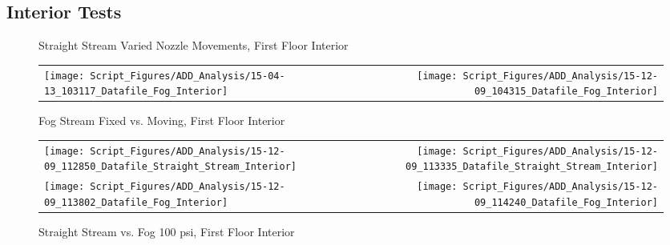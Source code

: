 \documentclass{article}
\begin{document}
\clearpage

\subsection{Interior Tests}

\begin{figure}[ht]
\centering
{}
\caption{Straight Stream Varied Nozzle Movements, First Floor Interior}
\label{fig:Straight Stream Varied Nozzle Movements, First Floor Interior}
\end{figure}

\begin{figure}[ht]
\begin{tabular*}{\textwidth}{lr}
\texttt{[image: Script\_Figures/ADD\_Analysis/15-04-13\_103117\_Datafile\_Fog\_Interior]} &
\texttt{[image: Script\_Figures/ADD\_Analysis/15-12-09\_104315\_Datafile\_Fog\_Interior]} \\
\end{tabular*}
\caption{Fog Stream Fixed vs. Moving, First Floor Interior}
\label{fig:Fog Stream Fixed vs. Moving, First Floor Interior}
\end{figure}

\clearpage

\begin{figure}[ht]
\begin{tabular*}{\textwidth}{lr}
\texttt{[image: Script\_Figures/ADD\_Analysis/15-12-09\_112850\_Datafile\_Straight\_Stream\_Interior]} &
\texttt{[image: Script\_Figures/ADD\_Analysis/15-12-09\_113335\_Datafile\_Straight\_Stream\_Interior]} \\
\texttt{[image: Script\_Figures/ADD\_Analysis/15-12-09\_113802\_Datafile\_Fog\_Interior]} &
\texttt{[image: Script\_Figures/ADD\_Analysis/15-12-09\_114240\_Datafile\_Fog\_Interior]} \\
\end{tabular*}
\caption{Straight Stream vs. Fog 100 psi, First Floor Interior}
\label{fig:Straight Stream vs. Fog 100 psi, First Floor Interior}
\end{figure}
\end{document}
